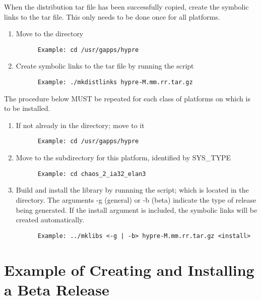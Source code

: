 When the distribution tar file has been successfully copied, create the symbolic
links to the tar file. This only needs to be done once for all platforms.

\begin{enumerate}
\item Move to the  directory
\begin{verbatim}
      Example: cd /usr/gapps/hypre
\end{verbatim}
\item Create symbolic links to the tar file by running the  script
\begin{verbatim}
      Example: ./mkdistlinks hypre-M.mm.rr.tar.gz
\end{verbatim}
\end{enumerate}

The procedure below MUST be repeated for each class of platforms on which \hypre{} is 
to be installed. 

\begin{enumerate}
\item If not already in the  directory; move to it
\begin{verbatim}
      Example: cd /usr/gapps/hypre
\end{verbatim}
\item Move to the subdirectory for this platform, identified by SYS\_TYPE
\begin{verbatim}
      Example: cd chaos_2_ia32_elan3
\end{verbatim}
\item Build and install the library by runnning the  script; which is
         located in the  directory.
      The arguments -g (general) or -b (beta) indicate the type of release being 
          generated.  If the install argument is included, the symbolic links will 
          be created automatically.
\begin{verbatim}
      Example: ../mklibs <-g | -b> hypre-M.mm.rr.tar.gz <install>
\end{verbatim}
\end{enumerate}

\section{Example of Creating and Installing a Beta Release}
\label{Example of Creating and Installing a Beta Release}

